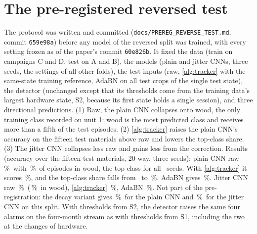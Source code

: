 \documentclass[10pt,twocolumn,letterpaper]{article}
\newcommand{\pct}{\,\%}
\begin{document}
\section{The pre-registered reversed test}
The protocol was written and committed (\texttt{docs/PREREG\_REVERSE\_TEST.md}, commit \texttt{659e98a}) before any model of the reversed split was trained, with every setting frozen as of the paper's commit \texttt{60e826b}. It fixed the data (train on campaigns C and D, test on A and B), the models (plain and jitter CNNs, three seeds, the settings of all other folds), the test inputs (raw, \cref{alg:tracker} with the same-state training reference, AdaBN on all test crops of the single test state), the detector (unchanged except that its thresholds come from the training data's largest hardware state, S2, because its first state holds a single session), and three directional predictions. (1) Raw, the plain CNN collapses onto wood, the only training class recorded on unit 1: wood is the most predicted class and receives more than a fifth of the test episodes. (2) \cref{alg:tracker} raises the plain CNN's accuracy on the fifteen test materials above raw and lowers the top-class share. (3) The jitter CNN collapses less raw and gains less from the correction. Results (accuracy over the fifteen test materials, 20-way, three seeds): plain CNN raw \FoABRevSupRawAcc\pct\ with \RevSupWoodShare\pct\ of episodes in wood, the top class for all \RevSupWoodTopN\ seeds. With \cref{alg:tracker} it scores \FoABRevSupTrkStateAcc\pct, and the top-class share falls from \FoABRevSupRawTop\ to \FoABRevSupTrkStateTop\pct. AdaBN gives \RevSupAdabnAcc\pct. Jitter CNN raw \FoABRevAugRawAcc\pct\ (\RevAugWoodShare\pct\ in wood), \cref{alg:tracker} \FoABRevAugTrkStateAcc\pct, AdaBN \RevAugAdabnAcc\pct. Not part of the pre-registration: the decay variant gives \FoABRevSupDecayStateAcc\pct\ for the plain CNN and \FoABRevAugDecayStateAcc\pct\ for the jitter CNN on this split. With thresholds from S2, the detector raises the same four alarms on the four-month stream as with thresholds from S1, including the two at the changes of hardware.
\end{document}
